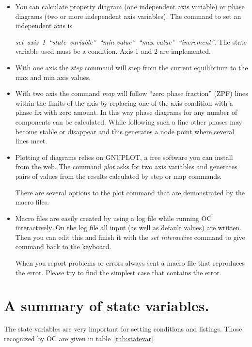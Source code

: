 \documentclass[12pt]{article}
\begin{document}
\begin{itemize}
\item You can calculate property diagram (one independent axis
  variable) or phase diagrams (two or more independent axis variables).
  The command to set an independent axis is

  {\em set~axis~1~``state~variable''~``min value''~``max
    value''~``increment''}.  The state variable used must be a
  condition.  Axis 1 and 2 are implemented.

\item With one axis the {\em step} command will step from the current
  equilibrium to the max and min axis values.

\item With two axis the command {\em map} will follow ``zero phase
  fraction'' (ZPF) lines within the limits of the axis by replacing
  one of the axis condition with a phase fix with zero amount.  In
  this way phase diagrams for any number of components can be
  calculated.  While following such a line other phases may become
  stable or disappear and this generates a node point where several
  lines meet.

\item Plotting of diagrams relies on GNUPLOT, a free software you can
  install from the web.  The command {\em plot} asks for two axis
  variables and generates pairs of values from the results calculated
  by step or map commands.

  There are several options to the plot command that are demonstrated by
  the macro files.

\item Macro files are easily created by using a log file while running
  OC interactively.  On the log file all input (as well as default
  values) are written.  Then you can edit this and finish it with the
  {\em set interactive} command to give command back to the keyboard.

  When you report problems or errors always sent a macro file that
  reproduces the error.  Please try to find the simplest case that
  contains the error.
\end{itemize}

\section{A summary of state variables.}

The state variables are very important for setting conditions and
listings.  Those recognized by OC are given in
table~\ref{tab:statevar}.
\end{document}
